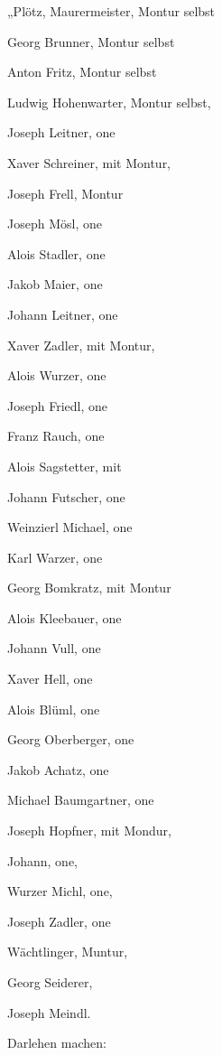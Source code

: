 \documentclass[12pt,a4paper]{book}
\begin{document}
\begin{compactitem}
\item „Plötz, Maurermeister, Montur selbst
\item Georg Brunner, Montur selbst
\item Anton Fritz, Montur selbst
\item Ludwig Hohenwarter, Montur selbst,
\item Joseph Leitner, one
\item Xaver Schreiner, mit Montur,
\item Joseph Frell, Montur
\item Joseph Mösl, one
\item Alois Stadler, one
\item Jakob Maier, one
\item Johann Leitner, one
\item Xaver Zadler, mit Montur,
\item Alois Wurzer, one
\item Joseph Friedl, one
\item Franz Rauch, one
\item Alois Sagstetter, mit
\item Johann Futscher, one
\item Weinzierl Michael, one
\item Karl Warzer, one
\item Georg Bomkratz, mit Montur
\item Alois Kleebauer, one
\item Johann Vull, one
\item Xaver Hell, one
\item Alois Blüml, one
\item Georg Oberberger, one
\item Jakob Achatz, one
\item Michael Baumgartner, one
\item Joseph Hopfner, mit Mondur,
\item Johann, one,
\item Wurzer Michl, one,
\item Joseph Zadler, one
\item Wächtlinger, Muntur,
\item Georg Seiderer,
\item Joseph Meindl.
\end{compactitem}

Darlehen machen:
\end{document}
